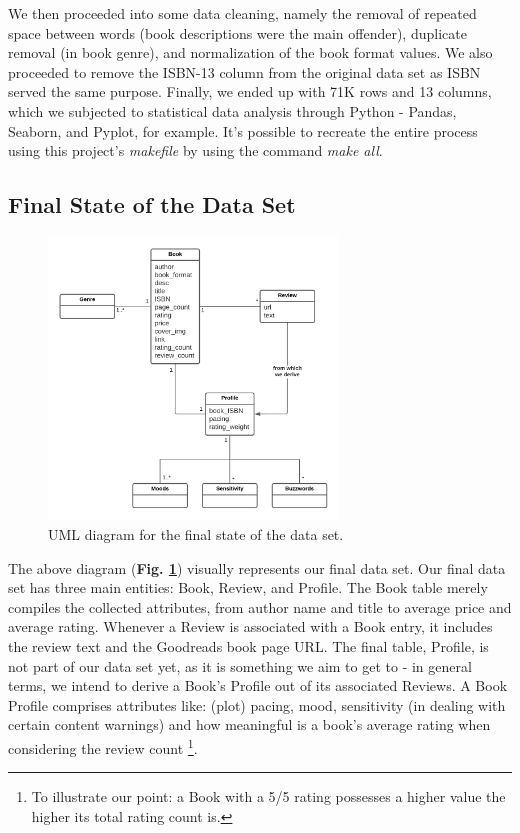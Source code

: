 \documentclass[conference]{IEEEtran}
\begin{document}
We then proceeded into some data cleaning, namely the removal of repeated space between words (book descriptions were the main offender), duplicate removal (in book genre), and normalization of the book format values. We also proceeded to remove the ISBN-13 column from the original data set as ISBN served the same purpose. \newline
Finally, we ended up with 71K rows and 13 columns, which we subjected to statistical data analysis through Python - Pandas, Seaborn, and Pyplot, for example. \newline
It's possible to recreate the entire process using this project's \textit{makefile} by using the command \textit{make all}.

\subsection{Final State of the Data Set}
\begin{figure}[h]
    \centering
    \includegraphics[height=7.5cm]{figures/UML_diagram.png}
    \caption{UML diagram for the final state of the data set.}
    \label{fig:uml}
\end{figure}

The above diagram (\textbf{Fig. \ref{fig:uml}}) visually represents our final data set.
Our final data set has three main entities: Book, Review, and Profile. The Book table merely compiles the collected attributes, from author name and title to average price and average rating. Whenever a Review is associated with a Book entry, it includes the review text and the Goodreads book page URL. The final table, Profile, is not part of our data set yet, as it is something we aim to get to - in general terms, we intend to derive a Book's Profile out of its associated Reviews. \newline
A Book Profile comprises attributes like: (plot) pacing, mood, sensitivity (in dealing with certain content warnings) and how meaningful is a book's average rating when considering the review count \footnote{To illustrate our point: a Book with a 5/5 rating possesses a higher value the higher its total rating count is.}.
\end{document}
